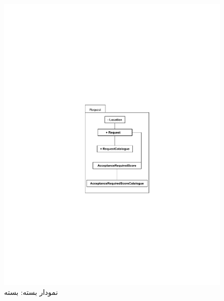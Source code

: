 \begin{figure}[ht!]
	\centering
	\includegraphics[scale=0.8]{figs/OOD-package-2.pdf}
	\caption{نمودار بسته: بسته }
\end{figure}
\FloatBarrier
\newpage


